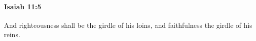 
		\paragraph{Isaiah 11:5} %
			\label{ISAIAH-11-5}

			And righteousness shall be the girdle of his loins, and faithfulness the girdle of his reins.


